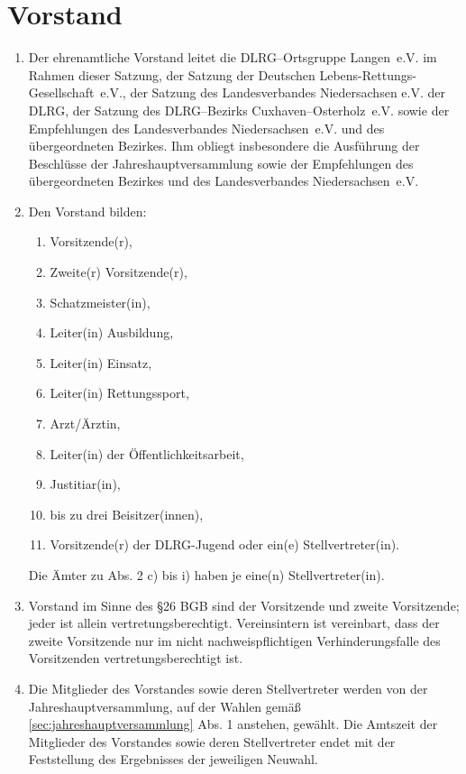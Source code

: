 \documentclass[%
12pt, %
a4paper, %
headsepline, %
parskip, %
headings=normal, %
]{scrreprt}
\begin{document}
\section{Vorstand}
\label{sec:vorstand}
\begin{enumerate}
    \item Der ehrenamtliche Vorstand leitet die DLRG--Ortsgruppe Langen~e.V. im Rahmen dieser Satzung, der Satzung der Deutschen Lebens-Rettungs-Gesellschaft~e.V., der Satzung des Landesverbandes Niedersachsen e.V. der DLRG, der Satzung des DLRG--Bezirks Cuxhaven--Osterholz~e.V. sowie der Empfehlungen des Landesverbandes Niedersachsen~e.V. und des übergeordneten Bezirkes. Ihm obliegt insbesondere die Ausführung der Beschlüsse der Jahreshauptversammlung sowie der Empfehlungen des übergeordneten Bezirkes und des Landesverbandes Niedersachsen~e.V.
    \item Den Vorstand bilden:\begin{enumerate}[noitemsep]
        \item Vorsitzende(r),
        \item Zweite(r) Vorsitzende(r),
        \item Schatzmeister(in),
        \item Leiter(in) Ausbildung,
        \item Leiter(in) Einsatz,
        \item Leiter(in) Rettungssport,
        \item Arzt/Ärztin,
        \item Leiter(in) der Öffentlichkeitsarbeit,
        \item Justitiar(in),
        \item bis zu drei Beisitzer(innen),
        \item Vorsitzende(r) der DLRG-Jugend oder ein(e) Stellvertreter(in).
    \end{enumerate}
    Die Ämter zu Abs. 2 c) bis i) haben je eine(n) Stellvertreter(in).
    \item Vorstand im Sinne des \S 26 BGB sind der Vorsitzende und zweite Vorsitzende; jeder ist allein vertretungsberechtigt. Vereinsintern ist vereinbart, dass der zweite Vorsitzende nur im nicht nachweispflichtigen Verhinderungsfalle des Vorsitzenden vertretungsberechtigt ist.
    \item Die Mitglieder des Vorstandes sowie deren Stellvertreter werden von der Jahreshauptversammlung, auf der Wahlen gemäß \ref{sec:jahreshauptversammlung} Abs. 1 anstehen, gewählt. Die Amtszeit der Mitglieder des Vorstandes sowie deren Stellvertreter endet mit der Feststellung des Ergebnisses der jeweiligen Neuwahl.

\end{enumerate}
\end{document}
